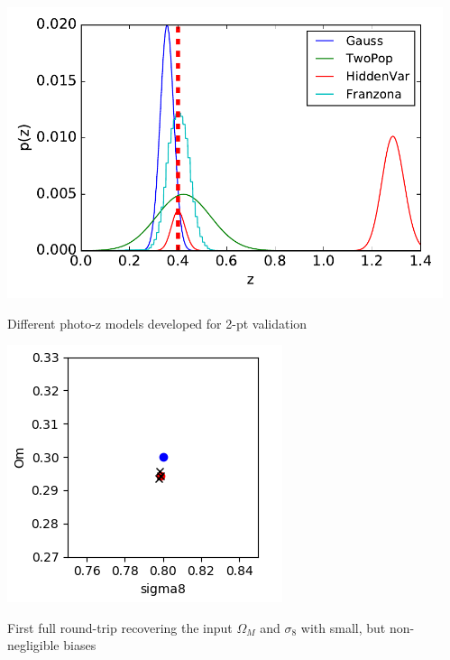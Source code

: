 \documentclass{beamer}
\begin{document}
\begin{frame}
\begin{columns}
\begin{column}{8cm}
    \end{column}
    \begin{column}{4cm}
      \includegraphics[width=\linewidth]{./ptest04.pdf}
      \vspace*{-0.3cm}
      \begin{center}
        \tiny Different photo-z models developed for 2-pt validation
      \end{center}

      \begin{center}
        \includegraphics[width=0.8\linewidth]{./xx.png}

        \tiny First full round-trip recovering the input $\Omega_M$
        and $\sigma_8$ with small, but non-negligible biases

      \end{center}
    \end{column}
  \end{columns}
\end{frame}
\end{document}
